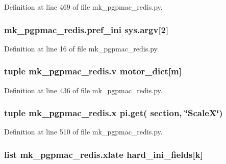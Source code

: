 Definition at line 469 of file mk\-\_\-pgpmac\-\_\-redis.\-py.

\hypertarget{namespacemk__pgpmac__redis_a38c785af5201403976e1267c47ea5096}{
\subsubsection[{pref\-\_\-ini}]{\setlength{\rightskip}{0pt plus 5cm}mk\-\_\-pgpmac\-\_\-redis.\-pref\-\_\-ini sys.\-argv\mbox{[}2\mbox{]}}}\label{namespacemk__pgpmac__redis_a38c785af5201403976e1267c47ea5096}


Definition at line 16 of file mk\-\_\-pgpmac\-\_\-redis.\-py.

\hypertarget{namespacemk__pgpmac__redis_ac732d49b0afca9a9951e3a252bae42fc}{
\subsubsection[{v}]{\setlength{\rightskip}{0pt plus 5cm}tuple mk\-\_\-pgpmac\-\_\-redis.\-v {\bf motor\-\_\-dict}\mbox{[}m\mbox{]}}}\label{namespacemk__pgpmac__redis_ac732d49b0afca9a9951e3a252bae42fc}


Definition at line 436 of file mk\-\_\-pgpmac\-\_\-redis.\-py.

\hypertarget{namespacemk__pgpmac__redis_abc8696f6f2f3fd3edd30989d3c8ec301}{
\subsubsection[{x}]{\setlength{\rightskip}{0pt plus 5cm}tuple mk\-\_\-pgpmac\-\_\-redis.\-x pi.\-get( section, \char`\"{}Scale\-X\char`\"{})}}\label{namespacemk__pgpmac__redis_abc8696f6f2f3fd3edd30989d3c8ec301}


Definition at line 510 of file mk\-\_\-pgpmac\-\_\-redis.\-py.

\hypertarget{namespacemk__pgpmac__redis_afba647feb8fc4d0a364c3dca29af3a22}{
\subsubsection[{xlate}]{\setlength{\rightskip}{0pt plus 5cm}list mk\-\_\-pgpmac\-\_\-redis.\-xlate {\bf hard\-\_\-ini\-\_\-fields}\mbox{[}k\mbox{]}}}\label{namespacemk__pgpmac__redis_afba647feb8fc4d0a364c3dca29af3a22}


